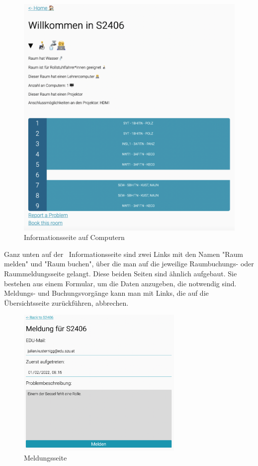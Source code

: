 \begin{figure}[H]
    \centering
    \includegraphics[width=120mm]{media/WebComponents/Rauminformationsseite.png}
    \caption{Informationsseite auf Computern}
    \label{fig:zeliainfopage}
\end{figure}

Ganz unten auf der \ZELIA\ Informationsseite sind zwei Links mit den Namen "Raum melden" und "Raum buchen", über die man auf die jeweilige Raumbuchungs- oder Raummeldungsseite gelangt. Diese beiden Seiten sind ähnlich aufgebaut. Sie bestehen aus einem Formular, um die Daten anzugeben, die notwendig sind. Meldungs- und Buchungsvorgänge kann man mit Links, die auf die Übersichtsseite zurückführen, abbrechen.

\begin{figure}[H]
    \centering
    \includegraphics[width=80mm]{media/WebComponents/Meldungsseite_light.png}
    \caption{Meldungsseite}
    
\end{figure}

